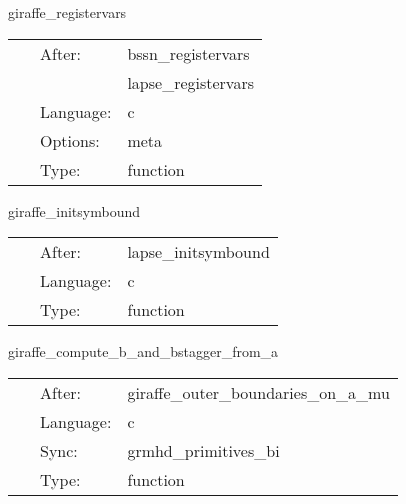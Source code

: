 
\hspace{5mm} giraffe\_registervars 

\hspace{5mm}{\it register evolved, rhs variables in giraffe for mol } 


\hspace{5mm}

 \begin{tabular*}{160mm}{cll} 
~ & After:  & bssn\_registervars \\ 
~& ~ &lapse\_registervars\\ 
~ & Language:  & c \\ 
~ & Options:  & meta \\ 
~ & Type:  & function \\ 
\end{tabular*} 


\vspace{5mm}


\hspace{5mm} giraffe\_initsymbound 

\hspace{5mm}{\it schedule symmetries } 


\hspace{5mm}

 \begin{tabular*}{160mm}{cll} 
~ & After:  & lapse\_initsymbound \\ 
~ & Language:  & c \\ 
~ & Type:  & function \\ 
\end{tabular*} 


\vspace{5mm}


\hspace{5mm} giraffe\_compute\_b\_and\_bstagger\_from\_a 

\hspace{5mm}{\it compute b and b\_stagger from a } 


\hspace{5mm}

 \begin{tabular*}{160mm}{cll} 
~ & After:  & giraffe\_outer\_boundaries\_on\_a\_mu \\ 
~ & Language:  & c \\ 
~ & Sync:  & grmhd\_primitives\_bi \\ 
~ & Type:  & function \\ 
\end{tabular*} 


